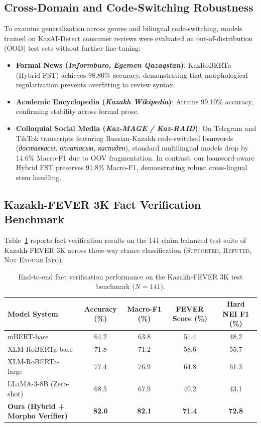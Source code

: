 \subsection{Cross-Domain and Code-Switching Robustness}
To examine generalization across genres and bilingual code-switching, models trained on KazAI-Detect consumer reviews were evaluated on out-of-distribution (OOD) test sets without further fine-tuning:
\begin{itemize}
    \item \textbf{Formal News (\textit{Informburo}, \textit{Egemen Qazaqstan})}: KazRoBERTa (Hybrid FST) achieves 98.80\% accuracy, demonstrating that morphological regularization prevents overfitting to review syntax.
    \item \textbf{Academic Encyclopedia (\textit{Kazakh Wikipedia})}: Attains 99.10\% accuracy, confirming stability across formal prose.
    \item \textbf{Colloquial Social Media (\textit{Kaz-MAGE / Kaz-RAID})}: On Telegram and TikTok transcripts featuring Russian-Kazakh code-switched loanwords (\textit{доставкасы, оплатасын, каспиден}), standard multilingual models drop by 14.6\% Macro-F1 due to OOV fragmentation. In contrast, our loanword-aware Hybrid FST preserves 91.8\% Macro-F1, demonstrating robust cross-lingual stem handling.
\end{itemize}

\subsection{Kazakh-FEVER 3K Fact Verification Benchmark}
Table~\ref{tab:verification_results} reports fact verification results on the 141-claim balanced test suite of Kazakh-FEVER 3K across three-way stance classification (\textsc{Supported}, \textsc{Refuted}, \textsc{Not Enough Info}).

\begin{table}[ht]
\centering
\small
\setlength{\tabcolsep}{4pt}
\caption{End-to-end fact verification performance on the Kazakh-FEVER 3K test benchmark ($N = 141$).}
\label{tab:verification_results}
\begin{tabular}{lcccc}
\toprule
\textbf{Model System} & \textbf{Accuracy (\%)} & \textbf{Macro-F1 (\%)} & \textbf{FEVER Score (\%)} & \textbf{Hard NEI F1 (\%)} \\
\midrule
mBERT-base & 64.2 & 63.8 & 51.4 & 48.2 \\
XLM-RoBERTa-base & 71.8 & 71.2 & 58.6 & 55.7 \\
XLM-RoBERTa-large & 77.4 & 76.9 & 64.8 & 61.3 \\
LLaMA-3-8B (Zero-shot) & 68.5 & 67.9 & 49.2 & 43.1 \\
\midrule
\textbf{Ours (Hybrid + Morpho Verifier)} & \textbf{82.6} & \textbf{82.1} & \textbf{71.4} & \textbf{72.8} \\
\bottomrule
\end{tabular}
\end{table}

